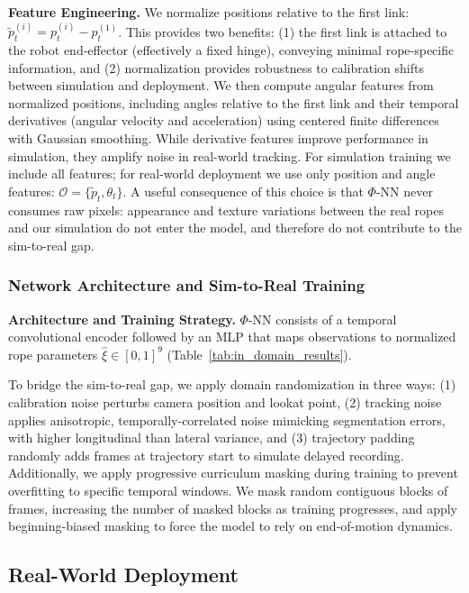 \documentclass[conference]{IEEEtran}
\begin{document}
\textbf{Feature Engineering.} We normalize positions relative to the first link: $\tilde{p}_t^{(i)} = p_t^{(i)} - p_t^{(1)}$. This provides two benefits: (1) the first link is attached to the robot end-effector (effectively a fixed hinge), conveying minimal rope-specific information, and (2) normalization provides robustness to calibration shifts between simulation and deployment. We then compute angular features from normalized positions, including angles relative to the first link and their temporal derivatives (angular velocity and acceleration) using centered finite differences with Gaussian smoothing. While derivative features improve performance in simulation, they amplify noise in real-world tracking. For simulation training we include all features; for real-world deployment we use only position and angle features: $\mathcal{O} = \{\tilde{p}_t, \theta_t\}$. A useful consequence of this choice is that $\Phi$-NN never consumes raw pixels: appearance and texture variations between the real ropes and our simulation do not enter the model, and therefore do not contribute to the sim-to-real gap.

\subsubsection{Network Architecture and Sim-to-Real Training}

\textbf{Architecture and Training Strategy.} $\Phi$-NN consists of a temporal convolutional encoder followed by an MLP that maps observations to normalized rope parameters $\hat{\xi} \in [0,1]^9$ (Table~\ref{tab:in_domain_results}).

To bridge the sim-to-real gap, we apply domain randomization in three ways: (1) calibration noise perturbs camera position and lookat point, (2) tracking noise applies anisotropic, temporally-correlated noise mimicking segmentation errors, with higher longitudinal than lateral variance, and (3) trajectory padding randomly adds frames at trajectory start to simulate delayed recording. Additionally, we apply progressive curriculum masking during training to prevent overfitting to specific temporal windows. We mask random contiguous blocks of frames, increasing the number of masked blocks as training progresses, and apply beginning-biased masking to force the model to rely on end-of-motion dynamics.

\subsection{Real-World Deployment}
\end{document}
